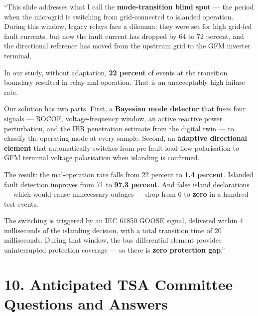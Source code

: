 \documentclass[12pt,a4paper]{article}
\begin{document}
\begin{speakbox}
``This slide addresses what I call the \textbf{mode-transition blind spot} —
the period when the microgrid is switching from grid-connected to islanded operation.
During this window, legacy relays face a dilemma: they were set for high grid-fed
fault currents, but now the fault current has dropped by 64 to 72 percent, and the
directional reference has moved from the upstream grid to the GFM inverter terminal.

In our study, without adaptation, \textbf{22 percent} of events at the transition
boundary resulted in relay mal-operation. That is an unacceptably high failure rate.

Our solution has two parts. First, a \textbf{Bayesian mode detector} that fuses four
signals — ROCOF, voltage-frequency window, an active reactive power perturbation,
and the IBR penetration estimate from the digital twin — to classify the operating
mode at every sample. Second, an \textbf{adaptive directional element} that
automatically switches from pre-fault load-flow polarisation to GFM terminal
voltage polarisation when islanding is confirmed.

The result: the mal-operation rate falls from 22 percent to \textbf{1.4 percent}.
Islanded fault detection improves from 71 to \textbf{97.3 percent}. And false
island declarations — which would cause unnecessary outages — drop from 6 to
\textbf{zero} in a hundred test events.

The switching is triggered by an IEC 61850 GOOSE signal, delivered within
4 milliseconds of the islanding decision, with a total transition time of 20
milliseconds. During that window, the bus differential element provides
uninterrupted protection coverage — so there is \textbf{zero protection gap}.''
\end{speakbox}

\section{10.\; Anticipated TSA Committee Questions and Answers}
\end{document}
